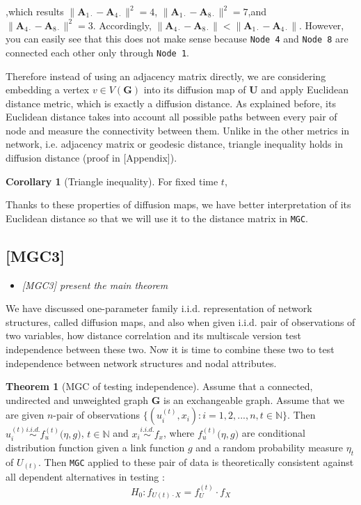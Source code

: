 \documentclass[12pt]{article}
\theoremstyle{definition}
\newtheorem{theorem}{Theorem}[section]
\newtheorem{corollary}{Corollary}[theorem]
\begin{document}
,which results $\parallel \boldsymbol{A}_{1 \cdot} -\boldsymbol{A}_{4 \cdot} \parallel^2 = 4$, $\parallel \boldsymbol{A}_{1 \cdot} -\boldsymbol{A}_{8 \cdot} \parallel^2 = 7$,and $\parallel \boldsymbol{A}_{4 \cdot} -\boldsymbol{A}_{8 \cdot} \parallel^2 = 3.$ Accordingly, $\parallel \boldsymbol{A}_{4 \cdot} -\boldsymbol{A}_{8 \cdot} \parallel  < \parallel \boldsymbol{A}_{1 \cdot} -\boldsymbol{A}_{4 \cdot} \parallel$. However, you can easily see that this does not make sense because \texttt{Node 4} and \texttt{Node 8} are connected each other only through \texttt{Node 1}. 

Therefore instead of using an adjacency matrix directly, we are considering embedding a vertex $v \in V(\boldsymbol{G})$ into its diffusion map of $\boldsymbol{U}$ and apply Euclidean distance metric, which is exactly a diffusion distance. As explained before, its Euclidean distance takes into account all possible paths between every pair of node and measure the connectivity between them. Unlike in the other metrics in network, i.e. adjacency matrix or geodesic distance, triangle inequality holds in diffusion distance (proof in [Appendix]). 

\begin{corollary}[Triangle inequality]
\label{corollary1}
For fixed time $t$, 
\end{corollary}	

Thanks to these properties of diffusion maps, we have better interpretation of its Euclidean distance so that we will use it to the distance matrix in \texttt{MGC}.



\subsection{[MGC3]}
\begin{itemize}
	\item {\it  [MGC3] present the main theorem  \/}
\end{itemize}

We have discussed one-parameter family i.i.d. representation of network structures, called diffusion maps, and also when given i.i.d. pair of observations of two variables, how distance correlation and its multiscale version test independence between these two. Now it is time to combine these two to test independence between network structures and nodal attributes.


\begin{theorem}[MGC of testing independence]
	\label{theorem1}
Assume that a connected, undirected and unweighted graph $\mathbf{G}$ is an exchangeable graph.  Assume that we are given $n$-pair of observations $\{ (u^{(t)}_{i}, x_{i}): i = 1,2,... , n  , t \in \mathbb{N} \}$. Then $u^{(t)}_{i} \overset{i.i.d.}{\sim} f^{(t)}_{u} \big(  \eta, g \big)$, $t \in \mathbb{N}$ and $x_{i} \overset{i.i.d.}{\sim} f_{x}$, where $f^{(t)}_{u} \big( \eta, g \big)$ are conditional distribution function given a link function $g$ and a random probability measure $\eta_{t}$ of $U_{(t)}$. Then \texttt{MGC} applied to these pair of data is theoretically consistent against all dependent alternatives in testing :
$$H_{0} : f_{U(t) \cdot X} = f^{(t)}_{U} \cdot f_{X}$$
\end{theorem}
\end{document}
